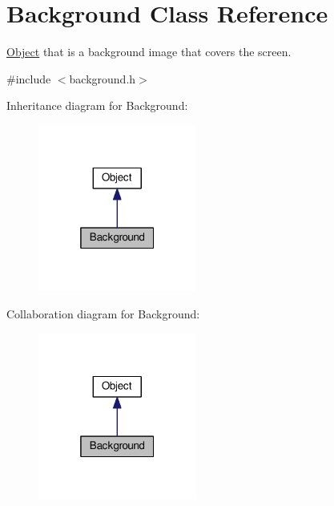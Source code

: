 \hypertarget{classBackground}{}\section{Background Class Reference}
\label{classBackground}


\hyperlink{classObject}{Object} that is a background image that covers the screen.  




{\ttfamily \#include $<$background.\+h$>$}



Inheritance diagram for Background\+:\nopagebreak
\begin{figure}[H]
\begin{center}
\leavevmode
\includegraphics[width=148pt]{classBackground__inherit__graph}
\end{center}
\end{figure}


Collaboration diagram for Background\+:\nopagebreak
\begin{figure}[H]
\begin{center}
\leavevmode
\includegraphics[width=148pt]{classBackground__coll__graph}
\end{center}
\end{figure}
